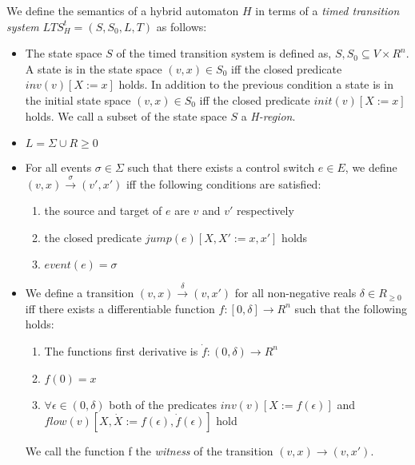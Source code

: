 \medskip
\begin{mydef}
We define the semantics of a hybrid automaton $H$ in terms of a \emph{timed transition system} $LTS^t_H = (S,S_0,L,T)$ as follows:


\begin{itemize}
 
\item The state space $S$ of the timed transition system is defined as, $S, S_0 \subseteq V \times R^n$. A state is in the state space $(v,x) \in S_0$ iff the closed predicate $inv(v)[X := x]$ holds. In addition to the previous condition a state is in the initial state space $(v,x) \in S_0$ iff the closed predicate $init(v)[X := x]$ holds. We call a subset of the state space $S$ a \emph{H-region}.


\item $L = \Sigma \cup R {\geq 0}$

\item For all events $\sigma \in \Sigma$ such that there exists a control switch $e \in E$, we define $(v,x) \xrightarrow{\sigma} (v',x')$ iff the following conditions are satisfied:
\begin{enumerate}
\item the source and target of $e$ are $v$ and $v'$ respectively
\item the closed predicate $jump(e)[X, X' := x,x']$ holds
\item $event(e) = \sigma$
\end{enumerate}

\item We define a transition $(v,x) \xrightarrow{\delta} (v,x')$ for all non-negative reals $\delta \in R_{\geq 0}$ iff there exists a differentiable function $f: [0, \delta] \to R^n$ such that the following holds:
\begin{enumerate}
\item The functions first derivative is $\dot{f} :(0,\delta) \to R^n$
\item $f(0) = x$
\item $\forall \epsilon \in (0,\delta)$ both of the predicates $inv(v)[X := f(\epsilon)]$ and $flow(v)[X,\dot{X} := f(\epsilon),\dot{f}(\epsilon)]$ hold
\end{enumerate}
We call the function f the \emph{witness} of the transition $(v,x) \to (v, x')$.

\end{itemize}


\end{mydef}
